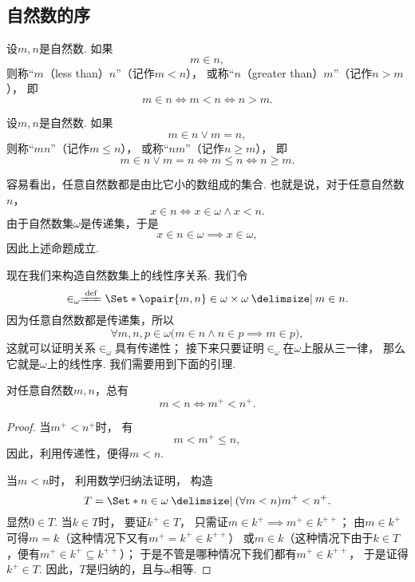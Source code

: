 \subsection{自然数的序}
\begin{definition}
设\(m,n\)是自然数.
如果\[
	m \in n,
\]
则称“\(m\)（less than）\(n\)”（记作\(m < n\)），
或称“\(n\)（greater than）\(m\)”（记作\(n > m\)），
即\[
	m \in n
	\iff m < n
	\iff n > m.
\]
\end{definition}

\begin{definition}
设\(m,n\)是自然数.
如果\[
	m \in n \lor m = n,
\]
则称“\(m\)\(n\)”（记作\(m \leqslant n\)），
或称“\(n\)\(m\)”（记作\(n \geqslant m\)），
即\[
	m \in n \lor m = n
	\iff m \leqslant n
	\iff n \geqslant m.
\]
\end{definition}

\begin{example}
容易看出，任意自然数都是由比它小的数组成的集合.
也就是说，对于任意自然数\(n\)，\[
	x \in n
	\iff
	x \in \omega \land x < n.
\]
由于自然数集\(\omega\)是传递集，于是\[
	x \in n \in \omega \implies x \in \omega,
\]
因此上述命题成立.
\end{example}

现在我们来构造自然数集上的线性序关系.
我们令\[
	\in_\omega \defeq \Set*{
		\opair{m,n} \in \omega \times \omega
		\given
		m \in n
	}.
\]
因为任意自然数都是传递集，所以\[
	\forall m,n,p \in \omega \bigl(
		m \in n \land n \in p
		\implies
		m \in p
	\bigr),
\]
这就可以证明关系\(\in_\omega\)具有传递性；
接下来只要证明\(\in_\omega\)在\(\omega\)上服从三一律，
那么它就是\(\omega\)上的线性序.
我们需要用到下面的引理.

\begin{lemma}\label{theorem:集合论.自然数的线性序.引理1}
对任意自然数\(m,n\)，总有\[
	m < n
	\iff
	m^+ < n^+.
\]
\begin{proof}
当\(m^+ < n^+\)时，
有\[
	m < m^+ \leqslant n,
\]
因此，利用传递性，便得\(m < n\).

当\(m < n\)时，
利用数学归纳法证明，
构造\[
	T = \Set*{
		n \in \omega
		\given
		(\forall m < n)
		m^+ < n^+
	}.
\]
显然\(0 \in T\).
当\(k \in T\)时，
要证\(k^+ \in T\)，
只需证\(m \in k^+ \implies m^+ \in k^{++}\)；
由\(m \in k^+\)可得\(m = k\)（这种情况下又有\(m^+ = k^+ \in k^{++}\)）
或\(m \in k\)（这种情况下由于\(k \in T\)，便有\(m^+ \in k^+ \subseteq k^{++}\)）；
于是不管是哪种情况下我们都有\(m^+ \in k^{++}\)，
于是证得\(k^+ \in T\).
因此，\(T\)是归纳的，且与\(\omega\)相等.
\end{proof}
\end{lemma}

